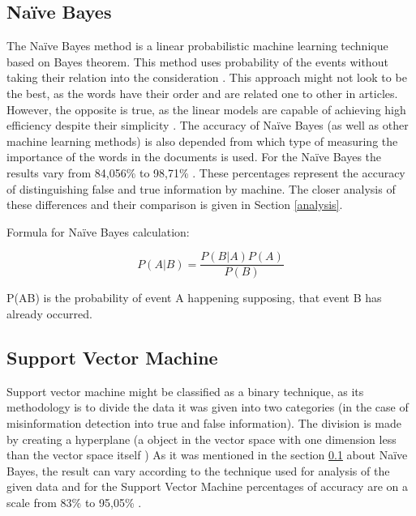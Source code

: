\documentclass[11pt ,english,a4paper]{article}
\begin{document}
\subsection{Naïve Bayes}\label{nb}
The Naïve Bayes method is a linear probabilistic machine learning technique based on Bayes theorem. This method uses probability of the events without taking their relation into the consideration \cite{sha20mach}. This approach might not look to be the best, as the words have their order and are related one to other in articles. However, the opposite is true, as the linear models are capable of achieving high efficiency despite their simplicity \cite{pod19mach}. The accuracy of Naïve Bayes (as well as other machine learning methods) is also depended from which type of measuring the importance of the words in the documents is used. For the Naïve Bayes the results vary from 84,056\% \cite{sha20mach} to 98,71\% \cite{bar21health}. These percentages represent the accuracy of distinguishing false and true information by machine. The closer analysis of these differences and their comparison is given in Section \ref{analysis}.

Formula for Naïve Bayes calculation: \cite{sha20mach}

\begin{equation}
P(A|B) = \frac{P(B|A)P(A)}{P(B)}
\end{equation}

P(A\textbar B) is the probability of event A happening supposing, that event B has already occurred.

\subsection{Support Vector Machine}\label{svm}
Support vector machine might be classified as a binary technique, as its methodology is to divide the data it was given into two categories \cite{pod19mach} (in the case of misinformation detection into true and false information). The division is made by creating a hyperplane (a object in the vector space with one dimension less than the vector space itself \cite{sha20mach})
As it was mentioned in the section \ref{nb} about Naïve Bayes, the result can vary according to the technique used for analysis of the given data and for the Support Vector Machine percentages of accuracy are on a scale from 83\% \cite{chap22unmask} to 95,05\% \cite{sha20mach}.
\end{document}
